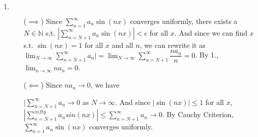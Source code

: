 \documentclass[12pt]{article}
\begin{document}
\begin{enumerate}
    \item $\ $\begin{enumerate}
        \item[($\implies$)] Since $\displaystyle\sum_{n=1}^{\infty} a_n \sin(nx)$ converges uniformly, 
        there exists a $N \in \mathbb{N}$ s.t. $|\displaystyle\sum_{n=N+1}^{\infty} a_n \sin(nx)| < \epsilon$ for all $x$.
        And since we can find $x$ s.t. $\sin(nx) = 1$ for all $x$ and all $n$, 
        we can rewrite it as $\displaystyle\lim_{N\to\infty}\displaystyle\sum_{n=N+1}^{\infty} a_n| = \displaystyle\lim_{N\to\infty} \displaystyle\sum_{n=N+1}^{\infty} \dfrac{na_n}{n} = 0$.
        By 1., $\displaystyle\lim_{n\to\infty} na_n = 0$.

        \item[($\impliedby$)] Since $na_n \to 0$, we have 
        
        $|\displaystyle\sum_{n=N+1}^{\infty} a_n \to 0$ as $N\to\infty$.
        And since $|\sin(nx)| \leq 1$ for all $x$, $|\displaystyle\sum_{n=N+1}^{infty} a_n sin(nx)| \leq \displaystyle\sum_{n=N+1}^{\infty} a_n \to 0$.
        By Cauchy Criterion, $\displaystyle\sum_{n=1}^{\infty} a_n \sin(nx)$ converges uniformly.

    \end{enumerate}
\end{enumerate}
\end{document}
